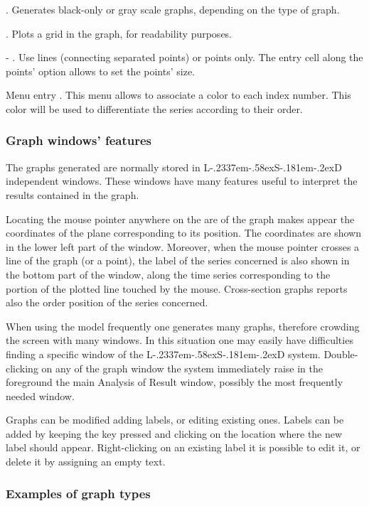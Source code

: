 \documentclass [11pt,a4paper] {book}
\def\LsD{{L\kern-.2337em\lower-.58ex\hbox{S}\kern-.181em\lower-.2ex\hbox{D}}\xspace}
\begin{document}
. Generates black-only or gray scale graphs, depending on the type of graph.

. Plots a grid in the graph, for readability purposes.

 - . Use lines (connecting separated points) or points only. The entry cell along the points' option allows to set the points' size.

Menu entry . This menu allows to associate a color to each index number. This color will be used to differentiate the series according to their order.
 
\subsubsection{Graph windows' features}

The graphs generated are normally stored in \LsD independent windows. These windows have many features useful to interpret the results contained in the graph.


Locating the mouse pointer anywhere on the are of the graph makes appear the coordinates of the plane corresponding to its position. The coordinates are shown in the lower left part of the window. Moreover, when the mouse pointer crosses a line of the graph (or a point), the label of the series concerned is also shown in the bottom part of the window, along the time series corresponding to the portion of the plotted line touched by the mouse. Cross-section graphs reports also the order position of the series concerned.

When using the model frequently one generates many graphs, therefore crowding the screen with many windows. In this situation one may easily have difficulties finding a specific window of the \LsD system. Double-clicking on any of the graph window the system immediately raise in the foreground the main Analysis of Result window, possibly the most frequently needed window.

Graphs can be modified adding labels, or editing existing ones. Labels can be added by keeping the key  pressed and clicking on the location where the new label should appear. Right-clicking on an existing label it is possible to edit it, or delete it by assigning an empty text.

\subsubsection{Examples of graph types}
\end{document}
